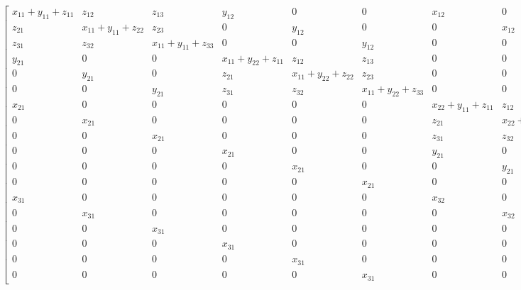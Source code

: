 \newpage
\begin{equation*}
\left[\begin{array}{cccccccccccccccccc}x_{11} + y_{11} + z_{11} & z_{12} & z_{13} & y_{12} & 0 & 0 & x_{12} & 0 & 0 & 0 & 0 & 0 & x_{13} & 0 & 0 & 0 & 0 & 0\\z_{21} & x_{11} + y_{11} + z_{22} & z_{23} & 0 & y_{12} & 0 & 0 & x_{12} & 0 & 0 & 0 & 0 & 0 & x_{13} & 0 & 0 & 0 & 0\\z_{31} & z_{32} & x_{11} + y_{11} + z_{33} & 0 & 0 & y_{12} & 0 & 0 & x_{12} & 0 & 0 & 0 & 0 & 0 & x_{13} & 0 & 0 & 0\\y_{21} & 0 & 0 & x_{11} + y_{22} + z_{11} & z_{12} & z_{13} & 0 & 0 & 0 & x_{12} & 0 & 0 & 0 & 0 & 0 & x_{13} & 0 & 0\\0 & y_{21} & 0 & z_{21} & x_{11} + y_{22} + z_{22} & z_{23} & 0 & 0 & 0 & 0 & x_{12} & 0 & 0 & 0 & 0 & 0 & x_{13} & 0\\0 & 0 & y_{21} & z_{31} & z_{32} & x_{11} + y_{22} + z_{33} & 0 & 0 & 0 & 0 & 0 & x_{12} & 0 & 0 & 0 & 0 & 0 & x_{13}\\x_{21} & 0 & 0 & 0 & 0 & 0 & x_{22} + y_{11} + z_{11} & z_{12} & z_{13} & y_{12} & 0 & 0 & x_{23} & 0 & 0 & 0 & 0 & 0\\0 & x_{21} & 0 & 0 & 0 & 0 & z_{21} & x_{22} + y_{11} + z_{22} & z_{23} & 0 & y_{12} & 0 & 0 & x_{23} & 0 & 0 & 0 & 0\\0 & 0 & x_{21} & 0 & 0 & 0 & z_{31} & z_{32} & x_{22} + y_{11} + z_{33} & 0 & 0 & y_{12} & 0 & 0 & x_{23} & 0 & 0 & 0\\0 & 0 & 0 & x_{21} & 0 & 0 & y_{21} & 0 & 0 & x_{22} + y_{22} + z_{11} & z_{12} & z_{13} & 0 & 0 & 0 & x_{23} & 0 & 0\\0 & 0 & 0 & 0 & x_{21} & 0 & 0 & y_{21} & 0 & z_{21} & x_{22} + y_{22} + z_{22} & z_{23} & 0 & 0 & 0 & 0 & x_{23} & 0\\0 & 0 & 0 & 0 & 0 & x_{21} & 0 & 0 & y_{21} & z_{31} & z_{32} & x_{22} + y_{22} + z_{33} & 0 & 0 & 0 & 0 & 0 & x_{23}\\x_{31} & 0 & 0 & 0 & 0 & 0 & x_{32} & 0 & 0 & 0 & 0 & 0 & x_{33} + y_{11} + z_{11} & z_{12} & z_{13} & y_{12} & 0 & 0\\0 & x_{31} & 0 & 0 & 0 & 0 & 0 & x_{32} & 0 & 0 & 0 & 0 & z_{21} & x_{33} + y_{11} + z_{22} & z_{23} & 0 & y_{12} & 0\\0 & 0 & x_{31} & 0 & 0 & 0 & 0 & 0 & x_{32} & 0 & 0 & 0 & z_{31} & z_{32} & x_{33} + y_{11} + z_{33} & 0 & 0 & y_{12}\\0 & 0 & 0 & x_{31} & 0 & 0 & 0 & 0 & 0 & x_{32} & 0 & 0 & y_{21} & 0 & 0 & x_{33} + y_{22} + z_{11} & z_{12} & z_{13}\\0 & 0 & 0 & 0 & x_{31} & 0 & 0 & 0 & 0 & 0 & x_{32} & 0 & 0 & y_{21} & 0 & z_{21} & x_{33} + y_{22} + z_{22} & z_{23}\\0 & 0 & 0 & 0 & 0 & x_{31} & 0 & 0 & 0 & 0 & 0 & x_{32} & 0 & 0 & y_{21} & z_{31} & z_{32} & x_{33} + y_{22} + z_{33}\end{array}\right]
\end{equation*}
